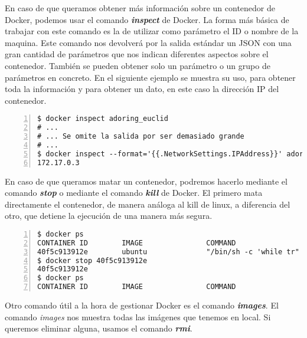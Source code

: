 	En caso de que queramos obtener más información sobre un contenedor de Docker, podemos usar el comando \textbf{\emph{inspect}} de Docker. La forma más básica de trabajar con este comando es la de utilizar como parámetro el ID o nombre de la maquina. Este comando nos devolverá por la salida estándar un JSON con una gran cantidad de parámetros que nos indican diferentes aspectos sobre el contenedor. También se pueden obtener solo un parámetro o un grupo de parámetros en concreto. En el siguiente ejemplo se muestra su uso, para obtener toda la información y para obtener un dato, en este caso la dirección IP del contenedor.
	
	\begin{lstlisting}[style=consola,numbers=left]
$ docker inspect adoring_euclid
# ...
# ... Se omite la salida por ser demasiado grande
# ...
$ docker inspect --format='{{.NetworkSettings.IPAddress}}' adoring_euclid
172.17.0.3
	\end{lstlisting}

	En caso de que queramos matar un contenedor, podremos hacerlo mediante el comando \textbf{\emph{stop}} o mediante el comando \textbf{\emph{kill}} de Docker. El primero mata directamente el contenedor, de manera análoga al kill de linux, a diferencia del otro, que detiene la ejecución de una manera más segura.
	
	\begin{lstlisting}[style=consola,numbers=left]
$ docker ps
CONTAINER ID        IMAGE               COMMAND                  CREATED             STATUS              PORTS               NAMES
40f5c913912e        ubuntu              "/bin/sh -c 'while tr"   2 seconds ago       Up 2 seconds                            adoring_euclid
$ docker stop 40f5c913912e
40f5c913912e
$ docker ps
CONTAINER ID        IMAGE               COMMAND                  CREATED             STATUS              PORTS               NAMES

	\end{lstlisting}
	
	Otro comando útil a la hora de gestionar Docker es el comando \textbf{\emph{images}}. El comando \textit{images} nos muestra todas las imágenes que tenemos en local. Si queremos eliminar alguna, usamos el comando \textbf{\emph{rmi}}.
	
